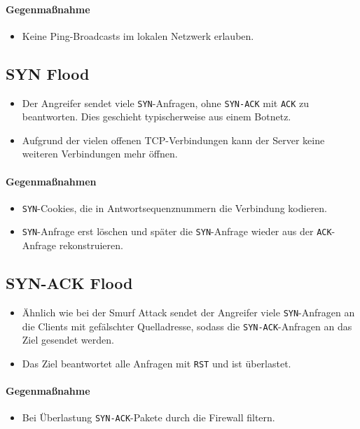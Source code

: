 			\paragraph{Gegenmaßnahme}
				\begin{itemize}
					\item Keine Ping-Broadcasts im lokalen Netzwerk erlauben.
				\end{itemize}

		\subsection{SYN Flood}
			\begin{itemize}
				\item Der Angreifer sendet viele \texttt{SYN}-Anfragen, ohne \texttt{SYN-ACK} mit \texttt{ACK} zu beantworten. Dies geschieht typischerweise aus einem Botnetz.
				\item Aufgrund der vielen offenen TCP-Verbindungen kann der Server keine weiteren Verbindungen mehr öffnen.
			\end{itemize}

			\paragraph{Gegenmaßnahmen}
				\begin{itemize}
					\item \texttt{SYN}-Cookies, die in Antwortsequenznummern die Verbindung kodieren.
					\item \texttt{SYN}-Anfrage erst löschen und später die \texttt{SYN}-Anfrage wieder aus der \texttt{ACK}-Anfrage rekonstruieren.
				\end{itemize}

		\subsection{SYN-ACK Flood}
			\begin{itemize}
				\item Ähnlich wie bei der Smurf Attack sendet der Angreifer viele \texttt{SYN}-Anfragen an die Clients mit gefälschter Quelladresse, sodass die \texttt{SYN-ACK}-Anfragen an das Ziel gesendet werden.
				\item Das Ziel beantwortet alle Anfragen mit \texttt{RST} und ist überlastet.
			\end{itemize}

			\paragraph{Gegenmaßnahme}
				\begin{itemize}
					\item Bei Überlastung \texttt{SYN-ACK}-Pakete durch die Firewall filtern.
				\end{itemize}

